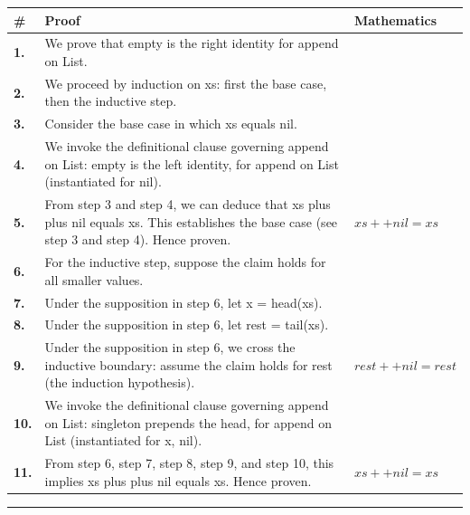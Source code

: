 \documentclass[11pt]{article}
\theoremstyle{definition}
\begin{document}
\begin{tabular}{@{} >{\raggedright\arraybackslash}p{} >{\raggedright\arraybackslash}p{} >{\raggedleft\arraybackslash}p{} @{}}
\textbf{\#} & \textbf{Proof} & \textbf{Mathematics} \\
\midrule
\textbf{1.} & We prove that empty is the right identity for append on List. & \\[0.45em]
\textbf{2.} & We proceed by induction on xs: first the base case, then the inductive step. & \\[0.45em]
\textbf{3.} & Consider the base case in which xs  equals  nil. & \\[0.45em]
\textbf{4.} & We invoke the definitional clause governing append on List: empty is the left identity, for append on List (instantiated for nil). & \\[0.45em]
\textbf{5.} & From step 3 and step 4, we can deduce that xs plus plus nil equals xs. This establishes the base case (see step 3 and step 4). Hence proven. & $\displaystyle xs ++ nil = xs$ \\[0.45em]
\textbf{6.} & For the inductive step, suppose the claim holds for all smaller values. & \\[0.45em]
\textbf{7.} & Under the supposition in step 6, let x = head(xs). & \\[0.45em]
\textbf{8.} & Under the supposition in step 6, let rest = tail(xs). & \\[0.45em]
\textbf{9.} & Under the supposition in step 6, we cross the inductive boundary: assume the claim holds for rest (the induction hypothesis). & $\displaystyle rest ++ nil = rest$ \\[0.45em]
\textbf{10.} & We invoke the definitional clause governing append on List: singleton prepends the head, for append on List (instantiated for x, nil). & \\[0.45em]
\textbf{11.} & From step 6, step 7, step 8, step 9, and step 10, this implies xs plus plus nil equals xs. Hence proven. & $\displaystyle xs ++ nil = xs$ \\[0.45em]
\bottomrule
\end{tabular}
\label{thm:List-append-empty_is_the_right_identity}
\par\medskip\hrule
\end{document}
